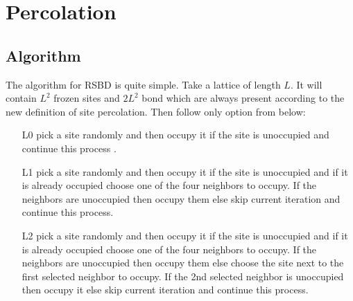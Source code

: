 


\ifpdf
\graphicspath{{Appendix1/figs/}}
\else
\graphicspath{{Appendix1/figs/}}
\fi

\chapter{Percolation} 
\label{appendix.percolation}
\section{Algorithm}
	The algorithm for RSBD is quite simple.	Take a lattice of length $L$. It will contain $L^2$ frozen sites and $2L^2$ bond which are always present according to the new definition of site percolation. Then follow only option from below:
	\begin{enumerate}
		\item[L0] pick a site randomly and then occupy it if the site is unoccupied and continue this process .
		
		\item[L1] pick a site randomly and then occupy it if the site is unoccupied and if it is already occupied choose one of the four neighbors to occupy. If the neighbors are unoccupied then occupy them else skip current iteration and  continue this process.
		
		\item[L2]  pick a site randomly and then occupy it if the site is unoccupied and if it is already occupied choose one of the four neighbors to occupy. If the neighbors are unoccupied then occupy them else choose the site next to the first selected neighbor to occupy. If the 2nd selected neighbor is unoccupied then occupy it else skip current iteration and  continue this process.
	\end{enumerate}
